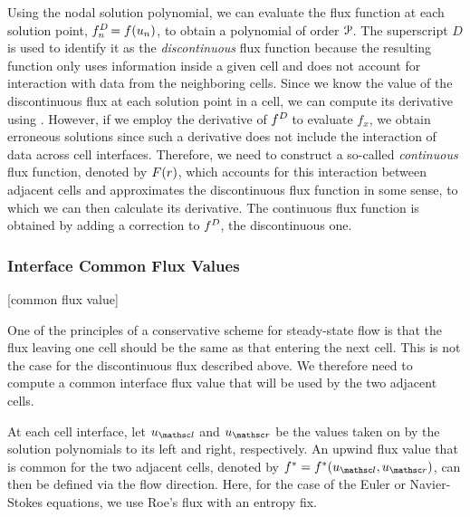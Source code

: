 Using the nodal solution polynomial, we can evaluate the flux function at
each solution point, \thatis
$\fD[n] = \flxfun(\uNodal[n])$,
to obtain a polynomial of order $\PO$.
%
The superscript $D$ is used to identify it as the \emph{discontinuous} flux
function because the resulting function only uses information inside a given
cell and does not account for interaction with data from the neighboring cells.
%
Since we know the value of the discontinuous flux at each solution point in a
cell, we can compute its derivative using .
%
However, if we employ the derivative of $\fD{}$ to evaluate $f_x$, we obtain
erroneous solutions since such a derivative does not include the interaction
of data across cell interfaces.
%
Therefore, we need to construct a so-called \emph{continuous} flux function,
denoted by $\fC(r)$, which accounts for this interaction between adjacent cells
and approximates the discontinuous flux function in some sense,
to which we can then calculate its derivative.
%
The continuous flux function is obtained by adding a correction
to $\fD$, the discontinuous one.


\subsubsection{Interface Common Flux Values}
\label{SEC:Intro:FR:Upwind}%
[common flux value]



One of the principles of a conservative scheme for steady-state flow
is that the flux leaving one cell should be the same as that entering
the next cell.
%
This is not the case for the discontinuous flux described above.
%
We therefore need to compute a common interface flux value that will be
used by the two adjacent cells.


At each cell interface, let $\uLeft{}$ and $\uRight{}$
be the values taken on by the solution polynomials to its left and right,
respectively.
%
An upwind flux value that is common for the two adjacent cells, denoted by
$\fupw = \fupw (\uLeft,\uRight)$,
can then be defined via the flow direction.
%
Here, for the case of the Euler or Navier-Stokes equations, we use
Roe’s flux\cite{Roe_1981} with an entropy fix\cite{Huynh_1995}.

